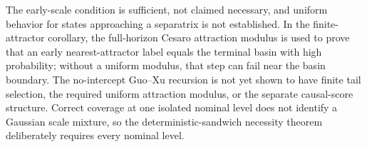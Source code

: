 The early-scale condition is sufficient, not claimed necessary, and uniform behavior for states approaching a separatrix is not established. In the finite-attractor corollary, the full-horizon Cesaro attraction modulus is used to prove that an early nearest-attractor label equals the terminal basin with high probability; without a uniform modulus, that step can fail near the basin boundary. The no-intercept Guo--Xu recursion is not yet shown to have finite tail selection, the required uniform attraction modulus, or the separate causal-score structure. Correct coverage at one isolated nominal level does not identify a Gaussian scale mixture, so the deterministic-sandwich necessity theorem deliberately requires every nominal level.